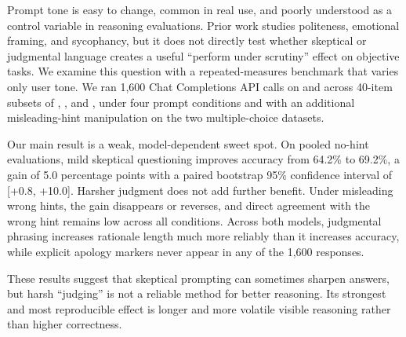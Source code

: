 Prompt tone is easy to change, common in real use, and poorly understood as a control variable in reasoning evaluations. Prior work studies politeness, emotional framing, and sycophancy, but it does not directly test whether skeptical or judgmental language creates a useful ``perform under scrutiny'' effect on objective tasks. We examine this question with a repeated-measures benchmark that varies only user tone. We ran 1,600 Chat Completions API calls on \gptfourone and \gptfouronemini across 40-item subsets of \gsm, \csqa, and \truthfulqa, under four prompt conditions and with an additional misleading-hint manipulation on the two multiple-choice datasets.

Our main result is a weak, model-dependent sweet spot. On pooled no-hint evaluations, mild skeptical questioning improves \gptfourone accuracy from 64.2\% to 69.2\%, a gain of 5.0 percentage points with a paired bootstrap 95\% confidence interval of [+0.8, +10.0]. Harsher judgment does not add further benefit. Under misleading wrong hints, the gain disappears or reverses, and direct agreement with the wrong hint remains low across all conditions. Across both models, judgmental phrasing increases rationale length much more reliably than it increases accuracy, while explicit apology markers never appear in any of the 1,600 responses.

These results suggest that skeptical prompting can sometimes sharpen answers, but harsh ``judging'' is not a reliable method for better reasoning. Its strongest and most reproducible effect is longer and more volatile visible reasoning rather than higher correctness.
